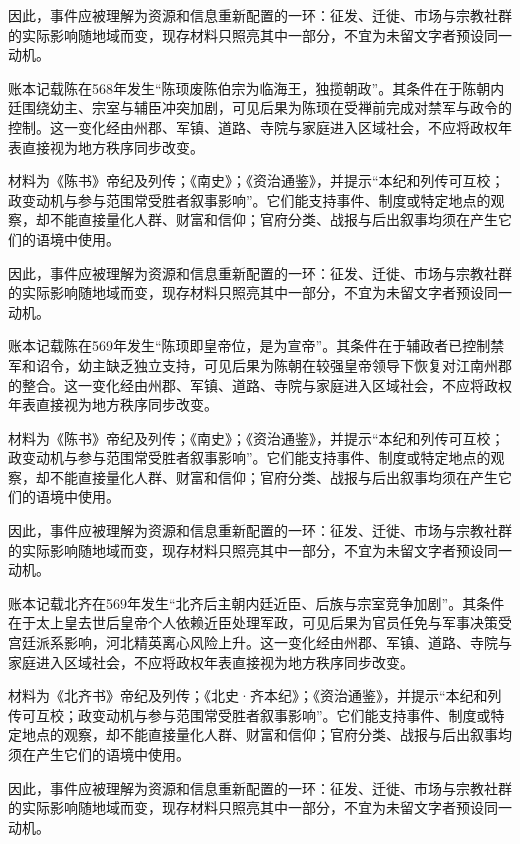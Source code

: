 因此，事件应被理解为资源和信息重新配置的一环：征发、迁徙、市场与宗教社群的实际影响随地域而变，现存材料只照亮其中一部分，不宜为未留文字者预设同一动机。

账本记载陈在568年发生“陈顼废陈伯宗为临海王，独揽朝政”。其条件在于陈朝内廷围绕幼主、宗室与辅臣冲突加剧，可见后果为陈顼在受禅前完成对禁军与政令的控制。这一变化经由州郡、军镇、道路、寺院与家庭进入区域社会，不应将政权年表直接视为地方秩序同步改变。

材料为《陈书》帝纪及列传；《南史》；《资治通鉴》，并提示“本纪和列传可互校；政变动机与参与范围常受胜者叙事影响”。它们能支持事件、制度或特定地点的观察，却不能直接量化人群、财富和信仰；官府分类、战报与后出叙事均须在产生它们的语境中使用。

因此，事件应被理解为资源和信息重新配置的一环：征发、迁徙、市场与宗教社群的实际影响随地域而变，现存材料只照亮其中一部分，不宜为未留文字者预设同一动机。

账本记载陈在569年发生“陈顼即皇帝位，是为宣帝”。其条件在于辅政者已控制禁军和诏令，幼主缺乏独立支持，可见后果为陈朝在较强皇帝领导下恢复对江南州郡的整合。这一变化经由州郡、军镇、道路、寺院与家庭进入区域社会，不应将政权年表直接视为地方秩序同步改变。

材料为《陈书》帝纪及列传；《南史》；《资治通鉴》，并提示“本纪和列传可互校；政变动机与参与范围常受胜者叙事影响”。它们能支持事件、制度或特定地点的观察，却不能直接量化人群、财富和信仰；官府分类、战报与后出叙事均须在产生它们的语境中使用。

因此，事件应被理解为资源和信息重新配置的一环：征发、迁徙、市场与宗教社群的实际影响随地域而变，现存材料只照亮其中一部分，不宜为未留文字者预设同一动机。

账本记载北齐在569年发生“北齐后主朝内廷近臣、后族与宗室竞争加剧”。其条件在于太上皇去世后皇帝个人依赖近臣处理军政，可见后果为官员任免与军事决策受宫廷派系影响，河北精英离心风险上升。这一变化经由州郡、军镇、道路、寺院与家庭进入区域社会，不应将政权年表直接视为地方秩序同步改变。

材料为《北齐书》帝纪及列传；《北史·齐本纪》；《资治通鉴》，并提示“本纪和列传可互校；政变动机与参与范围常受胜者叙事影响”。它们能支持事件、制度或特定地点的观察，却不能直接量化人群、财富和信仰；官府分类、战报与后出叙事均须在产生它们的语境中使用。

因此，事件应被理解为资源和信息重新配置的一环：征发、迁徙、市场与宗教社群的实际影响随地域而变，现存材料只照亮其中一部分，不宜为未留文字者预设同一动机。

